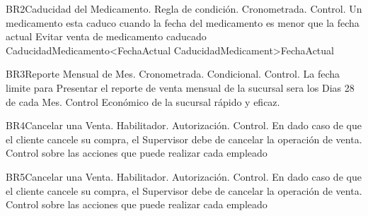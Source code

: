 \begin{BussinesRule}{BR2}{Caducidad del Medicamento.}
	\BRitem[Tipo:] Regla de condición. 
	\BRitem[Clase:] Cronometrada. 
	\BRitem[Nivel:] Control. %
	\BRitem[Descripción:] Un medicamento esta caduco cuando la fecha del medicamento es menor que la fecha actual
	\BRitem[Motivación:] Evitar venta de medicamento caducado
	 CaducidadMedicamento<FechaActual
	  CaducidadMedicament>FechaActual
\end{BussinesRule}
\begin{BussinesRule}{BR3}{Reporte Mensual de Mes.}
	\BRitem[Tipo:] Cronometrada. 
	\BRitem[Clase:] Condicional. 
	\BRitem[Nivel:] Control. %
	\BRitem[Descripción:] La fecha limite para Presentar el reporte de venta mensual de la sucursal sera los Dias 28 de cada Mes.
	\BRitem[Motivación:]  Control Económico de la sucursal rápido y eficaz.
\end{BussinesRule}
\begin{BussinesRule}{BR4}{Cancelar una Venta.}
	\BRitem[Tipo:] Habilitador. 
	\BRitem[Clase:] Autorización. 
	\BRitem[Nivel:] Control. %
	\BRitem[Descripción:] En dado caso de que el cliente cancele su compra, el Supervisor debe de cancelar la operación de venta.
	\BRitem[Motivación:]  Control sobre las acciones que puede realizar cada empleado
\end{BussinesRule}
\begin{BussinesRule}{BR5}{Cancelar una Venta.}
	\BRitem[Tipo:] Habilitador. 
	\BRitem[Clase:] Autorización. 
	\BRitem[Nivel:] Control. %
	\BRitem[Descripción:] En dado caso de que el cliente cancele su compra, el Supervisor debe de cancelar la operación de venta.
	\BRitem[Motivación:]  Control sobre las acciones que puede realizar cada empleado
\end{BussinesRule}
